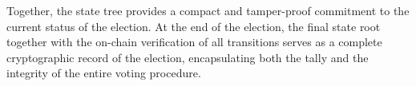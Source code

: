 Together, the state tree provides a compact and tamper-proof commitment to the current status of the election. At the end of the election, the final state root together with the on-chain verification of all transitions serves as a complete cryptographic record of the election, encapsulating both the tally and the integrity of the entire voting procedure.
